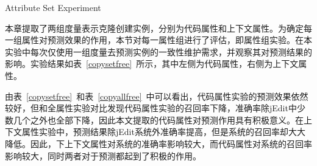 {Attribute Set Experiment}

本章提取了两组度量表示克隆创建实例，分别为代码属性和上下文属性。为确定每一组属性对预测效果的作用，本节对每一属性组进行了评估，即属性组实验。在本实验中每次仅使用一组度量去预测实例的一致性维护需求，并观察其对预测结果的影响。实验结果如表~\ref{copysetfree}~所示，其中左侧为代码属性，右侧为上下文属性。

由表~\ref{copysetfree}~和表~\ref{copyallfree}~中可以看出，代码属性实验的预测效果依然较好，但和全属性实验对比发现代码属性实验的召回率下降，准确率除jEdit中少数几个之外也全部下降，因此本文提取的代码属性对预测作用具有积极意义。在上下文属性实验中，预测结果除jEdit系统外准确率提高，但是系统的召回率却大大降低。因此，下上下文属性对系统的准确率影响较大，而代码属性对系统的召回率影响较大，同时两者对于预测都起到了积极的作用。


